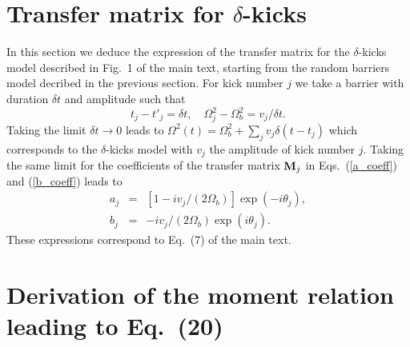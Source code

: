 \documentclass[ prl, twocolumn, superscriptaddress, amsfonts, amsmath,floatfix]{revtex4-1}
\newcommand{\Mg}{{\bf M}}
\begin{document}
\section{Transfer matrix for $\delta$-kicks}

In this section we deduce the expression of the transfer matrix for the $\delta$-kicks model described in Fig.~1 of the
main text, starting from the random barriers model decribed in the previous section. For kick number $j$ we take a barrier with duration $\delta t$ and amplitude such that
\begin{equation}
   t_j-t'_j=\delta t,
   \quad
   \Omega_j^2-\Omega_b^2=v_j/\delta t.
\end{equation}
Taking the limit $\delta t\to 0$ leads to $\Omega^2(t)=\Omega_b^2+\sum_j v_j\delta(t-t_j)$ which corresponds to the
$\delta$-kicks model with $v_j$ the amplitude of kick number $j$. Taking the same limit for the coefficients of the transfer matrix $\Mg_j$ in
Eqs.~(\ref{a_coeff}) and (\ref{b_coeff}) leads to
\begin{eqnarray}
   a_j &=& [1-iv_j/(2\Omega_b)]\exp(-i\theta_j),
\\
   b_j &=& -iv_j/(2\Omega_b)\exp(i\theta_j).
\end{eqnarray}
These expressions correspond to Eq.~(7) of the main text.

\section{Derivation of the moment relation leading to Eq.~(20)}
\end{document}
